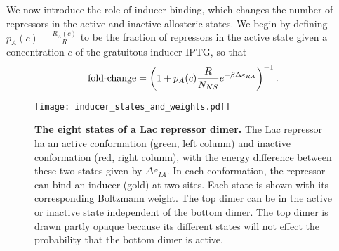 We now introduce the role of inducer binding, which changes the number of
repressors in the active and inactive allosteric states. We begin by defining
$p_A(c) \equiv \frac{R_A(c)}{R}$ to be the fraction of repressors in the
active state given a concentration $c$ of the gratuitous inducer IPTG, so that
\begin{equation}
\operatorname{fold-change} = \left( 1+p_A(c) \frac{R}{N_{NS}}e^{-\beta
	\Delta\varepsilon_{RA}} \right)^{-1}. \label{eq5}
\end{equation}


\begin{figure}[h]
	\centering \texttt{[image: inducer\_states\_and\_weights.pdf]}
	\caption{{\bf The eight states of a Lac repressor dimer. } The Lac repressor ha\globalScalePlotss
		an active conformation (green, left column) and inactive conformation (red,
		right column), with the energy difference between these two states given by
		$\Delta \varepsilon_{IA}$. In each conformation, the repressor can bind an inducer (gold) at
		two sites. Each state is shown with its corresponding Boltzmann weight. The top
		dimer can be in the active or inactive state independent of the bottom dimer.
		The top dimer is drawn partly opaque because its different states will not
		effect the probability that the bottom dimer is active. %
	} \label{figrepressorInducerStates}
\end{figure}

